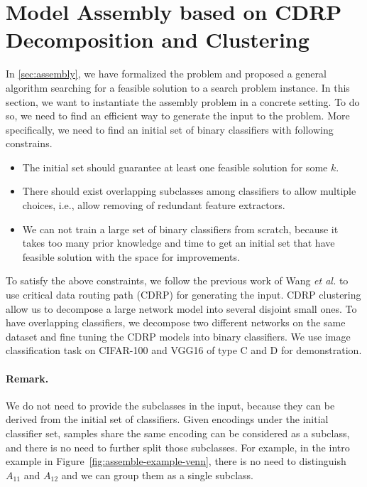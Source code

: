 \documentclass[sigplan,10pt,review]{acmart}\settopmatter{printfolios=true,printccs=false,printacmref=false}
\begin{document}
\section{Model Assembly based on CDRP Decomposition and Clustering}
\label{sec:cdrp}
In \cref{sec:assembly}, we have formalized the problem and proposed a general algorithm searching for a feasible solution to a search problem instance.
In this section, we want to instantiate the assembly problem in a concrete setting.
To do so, we need to find an efficient way to generate the input to the problem.
More specifically, we need to find an initial set of binary classifiers with following constrains.
\begin{itemize}
	\item The initial set should guarantee at least one feasible solution for some $k$.
	\item There should exist overlapping subclasses among classifiers to allow multiple choices, i.e., allow removing of redundant feature extractors.
	\item We can not train a large set of binary classifiers from scratch, because it takes too many prior knowledge and time to get an initial set that have feasible solution with the space for improvements.
\end{itemize}

To satisfy the above constraints, we follow the previous work of Wang \textit{et al.} \cite{wang2018interpret} to use critical data routing path (CDRP) for generating the input.
CDRP clustering allow us to decompose a large network model into several disjoint small ones.
To have overlapping classifiers, we decompose two different networks on the same dataset and fine tuning the CDRP models into binary classifiers.
We use image classification task on CIFAR-100 and VGG16 of type C and D for demonstration.

\paragraph{Remark.} We do not need to provide the subclasses in the input, because they can be derived from the initial set of classifiers.
Given encodings under the initial classifier set, samples share the same encoding can be considered as a subclass, and there is no need to further split those subclasses.
For example, in the intro example in Figure~\ref{fig:assemble-example-venn}, there is no need to distinguish $A_{11}$ and $A_{12}$ and we can group them as a single subclass.
\end{document}
